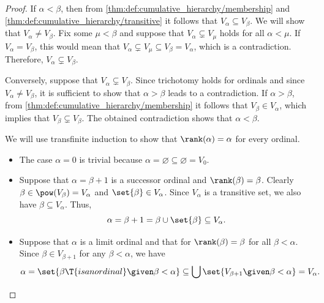 \begin{proof}
   If \( \alpha < \beta \), then from \cref{thm:def:cumulative_hierarchy/membership} and \cref{thm:def:cumulative_hierarchy/transitive} it follows that \( V_\alpha \subseteq V_\beta \). We will show that \( V_\alpha \neq V_\beta \). Fix some \( \mu < \beta \) and suppose that \( V_\alpha \subsetneq V_\mu \) holds for all \( \alpha < \mu \). If \( V_\alpha = V_\beta \), this would mean that \( V_\alpha \subsetneq V_\mu \subseteq V_\beta = V_\alpha \), which is a contradiction. Therefore, \( V_\alpha \subsetneq V_\beta \).

  Conversely, suppose that \( V_\alpha \subsetneq V_\beta \). Since trichotomy holds for ordinals and since \( V_\alpha \neq V_\beta \), it is sufficient to show that \( \alpha > \beta \) leads to a contradiction. If \( \alpha > \beta \), from \cref{thm:def:cumulative_hierarchy/membership} it follows that \( V_\beta \in V_\alpha \), which implies that \( V_\beta \subsetneq V_\beta \). The obtained contradiction shows that \( \alpha < \beta \).

   We will use transfinite induction to show that \( \rank(\alpha) = \alpha \) for every ordinal.
  \begin{itemize}
    \item The case \( \alpha = 0 \) is trivial because \( \alpha = \varnothing \subseteq \varnothing = V_0 \).

    \item Suppose that \( \alpha = \beta + 1 \) is a successor ordinal and \( \rank(\beta) = \beta \). Clearly \( \beta \in \pow(V_\beta) = V_\alpha \) and \( \set{ \beta } \in V_\alpha \). Since \( V_\alpha \) is a transitive set, we also have \( \beta \subseteq V_\alpha \). Thus,
    \begin{equation*}
      \alpha = \beta + 1 = \beta \cup \set{ \beta } \subseteq V_\alpha.
    \end{equation*}

    \item Suppose that \( \alpha \) is a limit ordinal and that for \( \rank(\beta) = \beta \) for all \( \beta < \alpha \). Since \( \beta \in V_{\beta + 1} \) for any \( \beta < \alpha \), we have
    \begin{equation*}
      \alpha
      =
      \set{ \beta \T{is an ordinal} \given \beta < \alpha }
      \subseteq
      \bigcup\set{ V_{\beta + 1} \given \beta < \alpha }
      =
      V_\alpha.
    \end{equation*}
  \end{itemize}


\end{proof}

